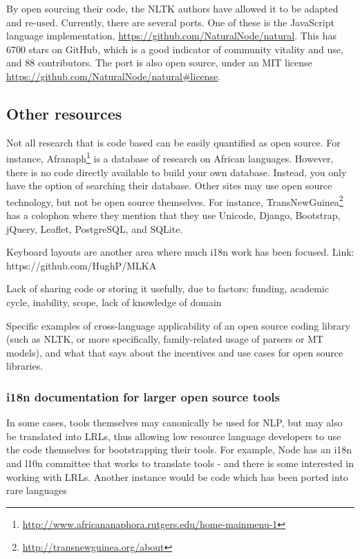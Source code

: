 By open sourcing their code, the NLTK authors have allowed it to be adapted and re-used. Currently, there are several ports. %
One of these is the JavaScript language implementation, \href{https://github.com/NaturalNode/natural}{https://github.com/NaturalNode/natural}. This has 6700 stars on GitHub, which is a good indicator of community vitality and use, and 88 contributors. The port is also open source, under an MIT license \href{https://github.com/NaturalNode/natural\#license}{https://github.com/NaturalNode/natural\#license}.

\subsection{Other resources}

Not all research that is code based can be easily quantified as open source. For instance, Afranaph\footnote{\href{http://www.africananaphora.rutgers.edu/home-mainmenu-1}{http://www.africananaphora.rutgers.edu/home-mainmenu-1}} is a database of research on African languages. However, there is no code directly available to build your own database. Instead, you only have the option of searching their database. Other sites may use open source technology, but not be open source themselves. For instance, TransNewGuinea\footnote{\href{http://transnewguinea.org/about}{http://transnewguinea.org/about}} has a colophon where they mention that they use Unicode, Django, Bootstrap, jQuery, Leaflet, PostgreSQL, and SQLite.

Keyboard layouts are another area where much i18n work has been focused. Link: https://github.com/HughP/MLKA

Lack of sharing code or storing it usefully, due to factors: funding, academic cycle, inability, scope, lack of knowledge of domain

Specific examples of cross-language applicability of an open source coding library (such as NLTK, or more specifically, family-related usage of parsers or MT models), and what that says about the incentives and use cases for open source libraries.

\subsubsection{i18n documentation for larger open source tools}

In some cases, tools themselves may canonically be used for NLP, but may also be translated into LRLs, thus allowing low resource language developers to use the code themselves for bootstrapping their tools. For example, Node has an i18n and l10n committee that works to translate tools - and there is some interested in working with LRLs. %
Another instance would be code which has been ported into rare languages %

